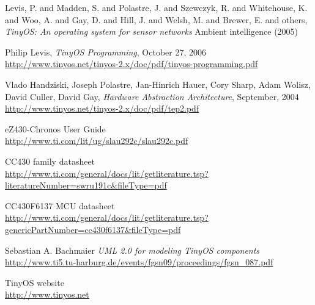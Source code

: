 \begin{thebibliography}{99}
Levis, P. and Madden, S. and Polastre, J. and Szewczyk, R. and Whitehouse, K. and Woo, A. and Gay, D. and Hill, J. and Welsh, M. and Brewer, E. and others,
\textit{TinyOS: An operating system for sensor networks}
Ambient intelligence (2005)

  Philip Levis, \textit{TinyOS Programming}, October 27, 2006 \\
  \url{http://www.tinyos.net/tinyos-2.x/doc/pdf/tinyos-programming.pdf}

  Vlado Handziski, Joseph Polastre, Jan-Hinrich Hauer, Cory Sharp,
  Adam Wolisz, David Culler, David Gay, \textit{Hardware Abstraction Architecture}, September,  2004 \\
  \url{http://www.tinyos.net/tinyos-2.x/doc/pdf/tep2.pdf}

  eZ430-Chronos User Guide \\
  \url{http://www.ti.com/lit/ug/slau292c/slau292c.pdf}

  CC430 family datasheet\\
  \url{http://www.ti.com/general/docs/lit/getliterature.tsp?literatureNumber=swru191c&fileType=pdf}

  CC430F6137 MCU datasheet \\
  \url{http://www.ti.com/general/docs/lit/getliterature.tsp?genericPartNumber=cc430f6137&fileType=pdf}

  Sebastian A. Bachmaier
  \textit{UML 2.0 for modeling TinyOS components} \\
  \url{http://www.ti5.tu-harburg.de/events/fgsn09/proceedings/fgsn_087.pdf}

  TinyOS website \\
  \url{http://www.tinyos.net}


\end{thebibliography}
